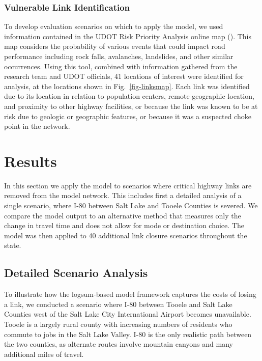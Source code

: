 \documentclass[]{ascelike-new}
\begin{document}
\subsubsection{Vulnerable Link
Identification}\label{vulnerable-link-identification}

To develop evaluation scenarios on which to apply the model, we used
information contained in the UDOT Risk Priority Analysis online map
(). This map considers the probability
of various events that could impact road performance including rock
falls, avalanches, landslides, and other similar occurrences. Using this
tool, combined with information gathered from the research team and UDOT
officials, 41 locations of interest were identified for analysis, at the
locations shown in Fig.~\ref{fig-linksmap}. Each link was identified due
to its location in relation to population centers, remote geographic
location, and proximity to other highway facilities, or because the link
was known to be at risk due to geologic or geographic features, or
because it was a suspected choke point in the network.


\section{Results}\label{sec-results}

In this section we apply the model to scenarios where critical highway
links are removed from the model network. This includes first a detailed
analysis of a single scenario, where I-80 between Salt Lake and Tooele
Counties is severed. We compare the model output to an alternative
method that measures only the change in travel time and does not allow
for mode or destination choice. The model was then applied to 40
additional link closure scenarios throughout the state.

\subsection{Detailed Scenario
Analysis}\label{detailed-scenario-analysis}

To illustrate how the logsum-based model framework captures the costs of
losing a link, we conducted a scenario where I-80 between Tooele and
Salt Lake Counties west of the Salt Lake City International Airport
becomes unavailable. Tooele is a largely rural county with increasing
numbers of residents who commute to jobs in the Salt Lake Valley. I-80
is the only realistic path between the two counties, as alternate routes
involve mountain canyons and many additional miles of travel.
\end{document}
